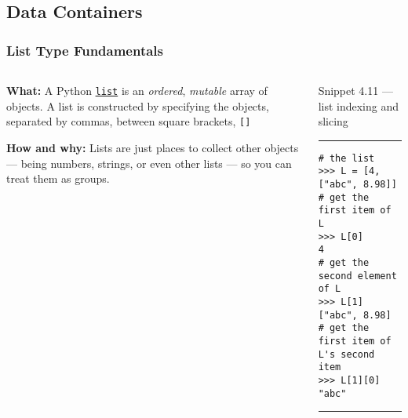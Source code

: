 \documentclass[aspectratio=1610]{beamer}
\begin{document}
\subsection{Data Containers}

\begin{frame}[fragile]
    \frametitle{List Type Fundamentals}
\begin{columns}
    \begin{column}{0.35\textwidth}
    \quad \textbf{What:} A Python \href{https://docs.python.org/3/tutorial/datastructures.html}{\texttt{list}} is an \emph{ordered}, \emph{mutable} array of objects. A list is constructed by specifying the objects, separated by commas, between square brackets, \texttt{[]}
    
    \vspace{1em}

    \quad \textbf{How and why:} Lists are just places to collect other objects --- being numbers, strings, or even other lists --- so you can treat them as groups.
    \end{column}
    \begin{column}{0.6\textwidth}
    \normalsize Snippet 4.11 --- list indexing and slicing 
    \rule{\textwidth}{1pt}
        \scriptsize
        \begin{verbatim}          
# the list
>>> L = [4, ["abc", 8.98]]
# get the first item of L
>>> L[0]
4
# get the second element of L
>>> L[1]
["abc", 8.98]
# get the first item of L's second item
>>> L[1][0]
"abc"
        \end{verbatim}
    \rule{\textwidth}{1pt}
    \end{column}
\end{columns}
\end{frame}
\end{document}
